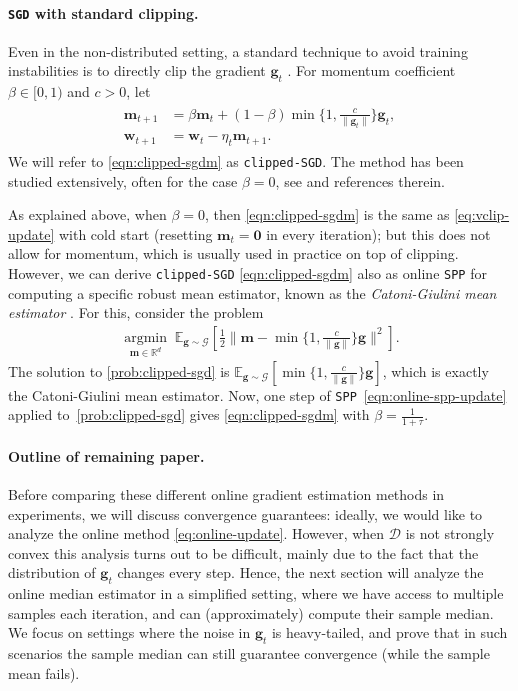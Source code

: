 \documentclass[10pt]{article} %
\renewcommand{\vec}[1]{\bm{#1}}
\DeclareMathOperator{\argmininn}{argmin}
\newcommand{\argmin}[1]{ \underset{#1}{\argmininn} \;}
\newcommand{\R}{\mathbb{R}}
\newcommand{\EE}[2]{\mathbb{E}_{#1}\left[#2\right] }
\newcommand{\dist}{\mathcal{D}}
\newcommand{\SGD}{\texttt{SGD}}
\newcommand{\SPP}{\texttt{SPP}}
\begin{document}
\paragraph{\SGD{} with standard clipping.}
Even in the non-distributed setting, a standard technique to avoid training instabilities is to directly clip the gradient $\vec{g}_t$ \citep{Zhang2020}. For momentum coefficient $\beta \in [0,1)$ and $c>0$, let 
\begin{align}\label{eqn:clipped-sgdm}
    \begin{split}
    \vec{m}_{t+1} &= \beta \vec{m}_t + (1-\beta) \min\{1,\tfrac{c}{\|\vec{g}_t\|}\}\vec{g}_t, \\
    \vec{w}_{t+1} &= \vec{w}_t - \eta_t \vec{m}_{t+1}.
    \end{split}
\end{align}
We will refer to \eqref{eqn:clipped-sgdm} as \texttt{clipped-SGD}.
The method has been studied extensively, often for the case $\beta=0$, see \citet{Zhang2020,Gorbunov2020,Koloskova2023,Puchkin2023} and references therein.

As explained above, when $\beta=0$, then \eqref{eqn:clipped-sgdm} is the same as \eqref{eq:vclip-update} with cold start (resetting $\vec{m}_t=\vec{0}$ in every iteration); but this does not allow for momentum, which is usually used in practice on top of clipping. 
However, we can derive \texttt{clipped-SGD} \eqref{eqn:clipped-sgdm} also as online \SPP{} for computing a specific robust mean estimator, known as the \textit{Catoni-Giulini mean estimator} \citep{Catoni2018,Lugosi2019}. For this, consider the problem
\begin{align}\label{prob:clipped-sgd}
    \argmin{\vec{m} \in \R^d} \EE{\vec{g}\sim \mathcal{G}}{\tfrac12 \|\vec{m} - \min\{1, \tfrac{c}{\|\vec{g}\|}\}\vec{g}\|^2}.
\end{align}
The solution to \eqref{prob:clipped-sgd} is $\EE{\vec{g}\sim \mathcal{G}}{\min\{1, \tfrac{c}{\|\vec{g}\|}\}\vec{g}}$, which is exactly the Catoni-Giulini mean estimator.
Now, one step of \SPP{}~\eqref{eqn:online-spp-update} applied to~\eqref{prob:clipped-sgd} gives \eqref{eqn:clipped-sgdm} with $\beta=\tfrac{1}{1+\tau}$.

\paragraph{Outline of remaining paper.} Before comparing these different online gradient estimation methods in experiments, we will discuss convergence guarantees: ideally, we would like to analyze the online method \eqref{eq:online-update}. However, when $\dist$ is not strongly convex this analysis turns out to be difficult, mainly due to the fact that the distribution of $\vec{g}_t$ changes every step. Hence, the next section will analyze the online median estimator in a simplified setting, where we have access to multiple samples each iteration, and can (approximately) compute their sample median.
We focus on settings where the noise in $\vec{g}_t$ is heavy-tailed, and prove that in such scenarios the sample median can still guarantee convergence (while the sample mean fails).
\end{document}
